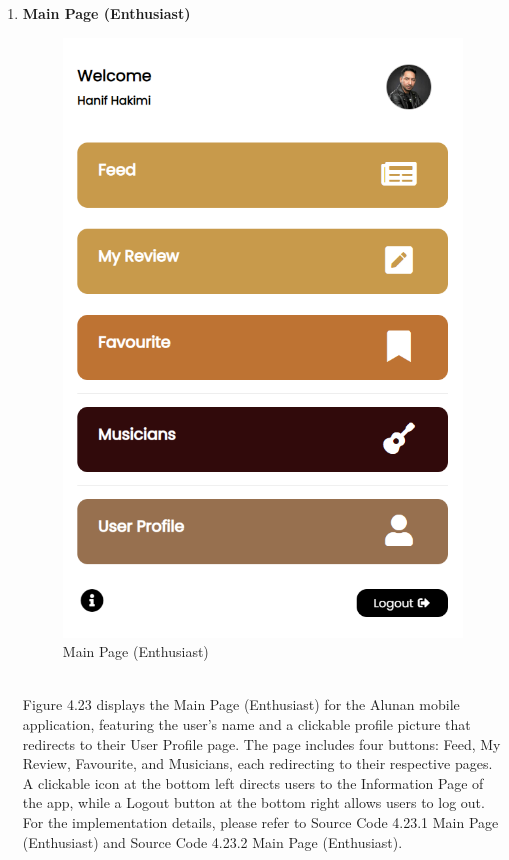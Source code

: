 \begin{enumerate}[1.]
    \item \textbf{Main Page (Enthusiast)}
    \begin{figure}[h]
        \centering
        \includegraphics[width=0.5\linewidth]{mainmatter/images/frontend/ss/Main Page (Enthusiast).png}
        \caption{Main Page (Enthusiast)}
        \label{fig:myfig62}
    \end{figure} \\
    Figure 4.23 displays the Main Page (Enthusiast) for the Alunan mobile application, featuring the user's name and a clickable profile picture that redirects to their User Profile page. The page includes four buttons: Feed, My Review, Favourite, and Musicians, each redirecting to their respective pages. A clickable icon at the bottom left directs users to the Information Page of the app, while a Logout button at the bottom right allows users to log out. For the implementation details, please refer to Source Code 4.23.1 Main Page (Enthusiast) and Source Code 4.23.2 Main Page (Enthusiast).
    \clearpage
    \begin{figure}[h]\ContinuedFloat
        \centering
        \begin{subfigure}[b]{0.6\textwidth}
            \centering

\end{subfigure}
\end{figure}
\end{enumerate}
